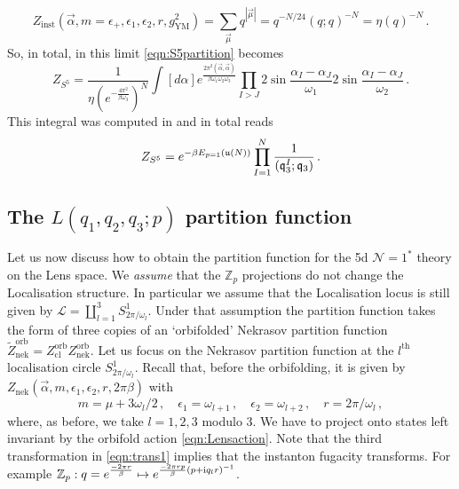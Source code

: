 \documentclass[main.tex]{subfiles}
\begin{document}
\begin{equation}
Z_{\text{inst}}\left(\vec{\alpha},m=\epsilon_+,\epsilon_1,\epsilon_2,r,g^2_{\text{YM}}\right)=\sum_{\vec{\mu}} q^{|\vec{\mu}|}=q^{-N/24}(q;q)^{-N}=\eta(q)^{-N}\,.
\end{equation} 
So, in total, in this limit \eqref{eqn:S5partition} becomes
\begin{equation}
Z_{S^5}=\frac{1}{\eta(e^{-\frac{4\pi^2}{\beta\omega_3}})^N}\int[d\alpha]e^{\frac{2\pi^2(\vec{\alpha},\vec{\alpha})}{\beta\omega_1\omega_2\omega_3}}\prod_{I>J}2\sin\frac{\alpha_I-\alpha_J}{\omega_1}2\sin\frac{\alpha_I-\alpha_J}{\omega_2}\,.
\end{equation}
This integral was computed in \cite{} and in total reads
\begin{equation}
Z_{S^5}=e^{-\beta E_{p=1}(\mathfrak{u}(N))}\prod_{I=1}^N\frac{1}{(\mathfrak{q}_3^I;\mathfrak{q}_3)}\,.
\end{equation}

\subsection{The $L(q_1,q_2,q_3;p)$ partition function}
Let us now discuss how to obtain the partition function for the 5d $\mathcal{N}=1^*$ theory on the Lens space. We \textit{assume} that the $\mathbb{Z}_p$ projections do not change the Localisation structure. In particular we assume that the Localisation locus is still given by $\mathcal{L}=\coprod_{l=1}^3S^1_{2\pi/\omega_l}$.
Under that assumption the partition function takes the form of three copies of an `orbifolded' Nekrasov partition function $\widetilde{Z}_{\text{nek}}^{\text{orb}}=Z_{\text{cl}}^{\text{orb}}Z_{\text{nek}}^{\text{orb}}$. 
Let us focus on the Nekrasov partition function at the $l^{\text{th}}$ localisation circle $S^1_{2\pi/\omega_l}$. Recall that, before the orbifolding, it is given by $Z_{\text{nek}}\left(\vec{\alpha},m,\epsilon_1,\epsilon_2,r,2\pi\beta\right)$ with 
\begin{equation}\label{eqn:S11Id}
m=\mu+3\omega_l/2\,,\quad \epsilon_1=\omega_{l+1}\,,\quad\epsilon_2=\omega_{l+2}\,,\quad r=2\pi/\omega_l\,,
\end{equation}
where, as before, we take $l=1,2,3$ modulo $3$. We have to project onto states left invariant by the orbifold action \eqref{eqn:Lensaction}. 
Note that the third transformation in \eqref{eqn:trans1} implies that the instanton fugacity transforms. For example $\mathbb{Z}_p:q=e^{\frac{-2\pi r}{\beta}}\mapsto e^{\frac{-2\pi rp}{\beta}\left(p+\mathrm{i} q_l r\right)^{-1}}$. 
\end{document}
